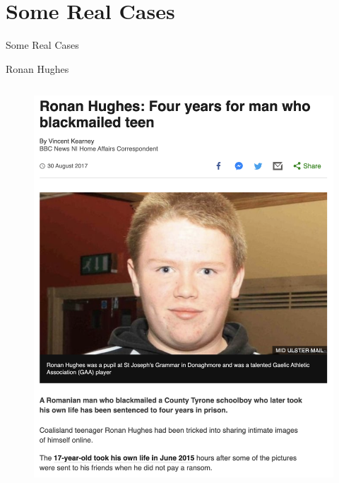 \documentclass[nobackground,dvipsnames,table]{beamer}
\begin{document}
\begin{frame}{} %
    \thispagestyle{empty}
\end{frame}

\section{Some Real Cases}

\begin{frame}{} %
    \thispagestyle{empty}
    \huge
    Some Real Cases
\end{frame}

\begin{frame}{Ronan Hughes}
    \begin{columns}
            \begin{figure}
                \centering
                \includegraphics[width=\textwidth]{ronan-hughes-article}
            \end{figure}

\end{columns}
\end{frame}
\end{document}
